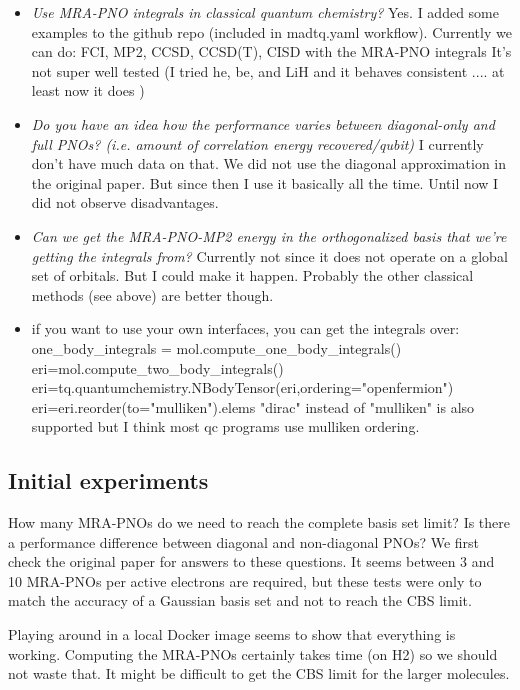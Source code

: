 \documentclass{article}
\begin{document}
\begin{itemize}
\item \textit{Use MRA-PNO integrals in classical quantum chemistry?} Yes. I added some examples to the github repo (included in madtq.yaml workflow). Currently we can do:
FCI, MP2, CCSD, CCSD(T), CISD
with the MRA-PNO integrals
It's not super well tested (I tried he, be, and LiH and it behaves consistent .... at least now it does  )
\item \textit{Do you have an idea how the performance varies between diagonal-only and full PNOs? (i.e. amount of correlation energy recovered/qubit)}
I currently don't have much data on that. We did not use the diagonal approximation in the original paper. But since then I use it basically all the time. Until now I did not observe disadvantages.
\item \textit{Can we get the MRA-PNO-MP2 energy in the orthogonalized basis that we’re getting the integrals from?}
Currently not since it does not operate on a global set of orbitals. But I could make it happen. Probably the other classical methods (see above) are better though.
\item if you want to use your own interfaces, you can get the integrals over:
one\_body\_integrals = mol.compute\_one\_body\_integrals()
eri=mol.compute\_two\_body\_integrals()
eri=tq.quantumchemistry.NBodyTensor(eri,ordering="openfermion")
eri=eri.reorder(to="mulliken").elems
"dirac" instead of "mulliken" is also supported but I think most qc programs use mulliken ordering.
\end{itemize}

\subsection{Initial experiments}

How many MRA-PNOs do we need to reach the complete basis set limit? Is there a performance difference between diagonal and non-diagonal PNOs? We first check the original paper for answers to these questions. It seems between 3 and 10 MRA-PNOs per active electrons are required, but these tests were only to match the accuracy of a Gaussian basis set and not to reach the CBS limit.

Playing around in a local Docker image seems to show that everything is working. Computing the MRA-PNOs certainly takes time (on H2) so we should not waste that. It might be difficult to get the CBS limit for the larger molecules.
\end{document}
